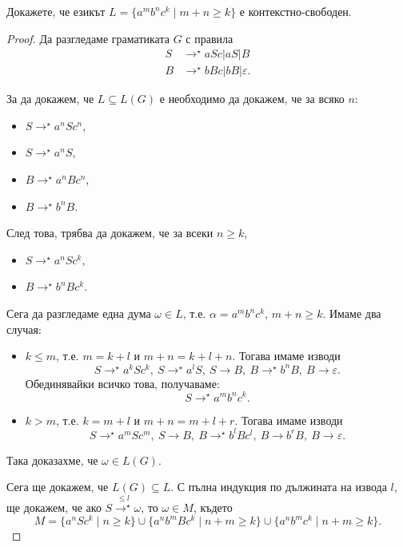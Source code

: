 \begin{prb}
  Докажете, че езикът $L = \{a^mb^nc^k\mid m+n \geq k\}$ е
  контекстно-свободен.
\end{prb}
\begin{proof}
  Да разгледаме граматиката $G$ с правила
  \begin{align*}
    S& \rightarrow^\star aSc\vert aS \vert B\\
    B& \rightarrow^\star bBc\vert bB\vert\varepsilon.
  \end{align*}
  
  За да докажем, че $L \subseteq L(G)$ е необходимо 
  да докажем, че за всяко $n$:
  \begin{itemize}
  \item 
    $S \rightarrow^\star a^nSc^n$,
  \item
    $S \rightarrow^\star a^nS$,
  \item
    $B \rightarrow^\star a^nBc^n$,
  \item
    $B \rightarrow^\star b^nB$.
  \end{itemize}
  След това, трябва да докажем, че за всеки $n \geq k$,
  \begin{itemize}
  \item 
    $S \rightarrow^\star a^nSc^k$,
  \item
    $B \rightarrow^\star b^nBc^k$.
  \end{itemize}
  Сега да разгледаме една дума $\omega \in L$, т.е. $\alpha = a^mb^nc^k$, $m+n \geq k$.
  Имаме два случая:
  \begin{itemize}
  \item 
    $k \leq m$, т.е. $m = k+l$ и $m+n = k+l+n$.
    Тогава имаме изводи
    \[S \rightarrow^\star a^kSc^k,\ S \rightarrow^\star a^lS,\ S \rightarrow B,\ B \rightarrow^\star b^nB,\ B \rightarrow \varepsilon.\]
    Обединявайки всичко това, получаваме:
    \[S \rightarrow^\star a^mb^nc^k.\]
  \item
    $k > m$, т.е. $k = m+l$ и $m+n = m+l+r$.
    Тогава имаме изводи
    \[S \rightarrow^\star a^mSc^m,\ S\rightarrow B,\ B\rightarrow^\star b^lBc^l,\ B\rightarrow b^rB,\ B\rightarrow\varepsilon.\]
  \end{itemize}
  Така доказахме, че $\omega \in L(G)$.
  
  Сега ще докажем, че $L(G) \subseteq L$.
  С пълна индукция по дължината на извода $l$,
  ще докажем, че ако $S \stackrel{\leq l}{\rightarrow^\star}\omega$, то $\omega \in M$, където
  \[M = \{a^nSc^k\mid n\geq k\}\cup\{a^nb^mBc^k\mid n+m\geq k\}\cup\{a^nb^mc^k\mid n+m\geq k\}.\]
  

\end{proof}
